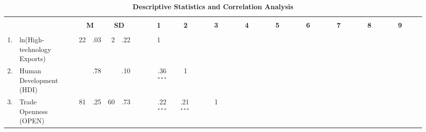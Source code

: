 
\begin{sidewaystable}[!htbp]
\setlength\tabcolsep{2pt}
\footnotesize
\centering

\caption{\textbf{ Descriptive Statistics and Correlation Analysis } } \label{table:correlation}
\vspace{.5cm}
\begin{tabularx}{0.9\textwidth}{r@{ \ \ }p{5cm}r@{}lr@{}lr@{}lr@{}lr@{}lr@{}lr@{}lr@{}lr@{}lr@{}lr@{}lr@{}lr@{}lp{1cm}}  %
\hline \\[-0.22cm]
\multicolumn{2}{c}{\textbf{ }}  & \multicolumn{2}{p{0.5cm}}{ } & \multicolumn{2}{c}{\textbf{M}} & \multicolumn{2}{c}{\textbf{SD}} & \multicolumn{2}{p{1.5cm}}{ }  & \multicolumn{2}{c}{\textbf{1}}  & \multicolumn{2}{c}{\textbf{2}}  & \multicolumn{2}{c}{\textbf{3}}  & \multicolumn{2}{c}{\textbf{4}}  & \multicolumn{2}{c}{\textbf{5}}  & \multicolumn{2}{c}{\textbf{6}}  & \multicolumn{2}{c}{\textbf{7}}  & \multicolumn{2}{c}{\textbf{8}}  & \multicolumn{2}{c}{\textbf{9}}  \\
\hline
 & \\
1. & ln(High-technology Exports) & \multicolumn{2}{p{0.5cm}}{ }  & 22&.03 & 2&.22 & \multicolumn{2}{p{0.5cm}}{ }   & \multicolumn{2}{c}{1}   & \multicolumn{2}{c}{ \  \  \  \  \  \  \ }   & \multicolumn{2}{c}{ \  \  \  \  \  \  \ }   & \multicolumn{2}{c}{ \  \  \  \  \  \  \ }   & \multicolumn{2}{c}{ \  \  \  \  \  \  \ }   & \multicolumn{2}{c}{ \  \  \  \  \  \  \ }   & \multicolumn{2}{c}{ \  \  \  \  \  \  \ }   & \multicolumn{2}{c}{ \  \  \  \  \  \  \ }   & \multicolumn{2}{c}{ \  \  \  \  \  \  \ }  \\[0.33cm]
2. & Human Development (HDI) & \multicolumn{2}{p{0.5cm}}{ }  & &.78 & &.10 & \multicolumn{2}{p{0.5cm}}{ }  & &.36{$^{***}$}  & \multicolumn{2}{c}{1}   & \multicolumn{2}{c}{ \  \  \  \  \  \  \ }   & \multicolumn{2}{c}{ \  \  \  \  \  \  \ }   & \multicolumn{2}{c}{ \  \  \  \  \  \  \ }   & \multicolumn{2}{c}{ \  \  \  \  \  \  \ }   & \multicolumn{2}{c}{ \  \  \  \  \  \  \ }   & \multicolumn{2}{c}{ \  \  \  \  \  \  \ }   & \multicolumn{2}{c}{ \  \  \  \  \  \  \ }  \\[0.33cm]
3. & Trade Openness (OPEN) & \multicolumn{2}{p{0.5cm}}{ }  & 81&.25 & 60&.73 & \multicolumn{2}{p{0.5cm}}{ }  & &.22{$^{***}$} & &.21{$^{***}$}  & \multicolumn{2}{c}{1}   & \multicolumn{2}{c}{ \  \  \  \  \  \  \ }   & \multicolumn{2}{c}{ \  \  \  \  \  \  \ }   & \multicolumn{2}{c}{ \  \  \  \  \  \  \ }   & \multicolumn{2}{c}{ \  \  \  \  \  \  \ }   & \multicolumn{2}{c}{ \  \  \  \  \  \  \ }   & \multicolumn{2}{c}{ \  \  \  \  \  \  \ }  \\[0.33cm]

\end{tabularx}
\end{sidewaystable}
